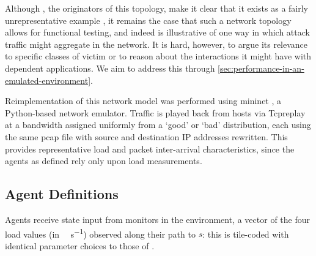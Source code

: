 \documentclass[conference, letterpaper, 10pt, times]{IEEEtran}
\begin{document}
Although \citeauthor{DBLP:journals/ccr/MahajanBFIPS02a}, the originators of this topology, make it clear that it exists as a fairly unrepresentative example \cite{DBLP:journals/ccr/MahajanBFIPS02a},
it remains the case that such a network topology allows for functional testing, and indeed is illustrative of one way in which attack traffic might aggregate in the network.
It is hard, however, to argue its relevance to specific classes of victim or to reason about the interactions it might have with dependent applications.
We aim to address this through \cref{sec:performance-in-an-emulated-environment}.

Reimplementation of this network model was performed using mininet \cite{mininet}, a Python-based network emulator.
Traffic is played back from hosts via Tcpreplay at a bandwidth assigned uniformly from a `good' or `bad' distribution, each using the same pcap file with source and destination IP addresses rewritten.
This provides representative load and packet inter-arrival characteristics, since the agents as defined rely only upon load measurements.

\subsection{Agent Definitions}

Agents receive state input from monitors in the environment, a vector of the four load values (in \si{\mega\bit\per\second}) observed along their path to $s$: this is tile-coded with identical parameter choices to those of \textcite{DBLP:phd/ethos/Malialis14}.
\end{document}
